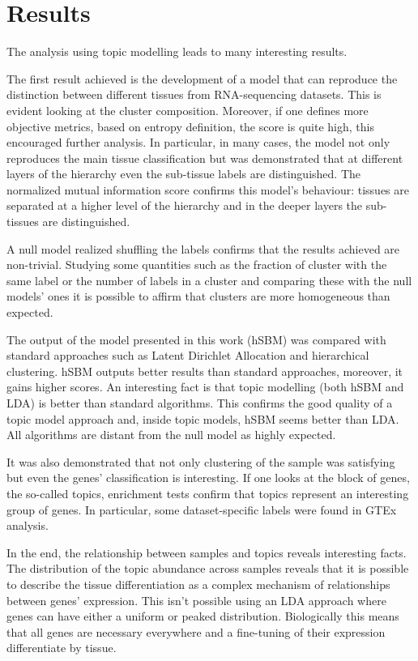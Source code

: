\section{Results}\label{sec:topic/results}
The analysis using topic modelling leads to many interesting results.

The first result achieved is the development of a model that can reproduce the distinction between different tissues from RNA-sequencing datasets. This is evident looking at the cluster composition. Moreover, if one defines more objective metrics, based on entropy definition, the score is quite high, this encouraged further analysis. In particular, in many cases, the model not only reproduces the main tissue classification but was demonstrated that at different layers of the hierarchy even the sub-tissue labels are distinguished. The normalized mutual information score confirms this model's behaviour: tissues are separated at a higher level of the hierarchy and in the deeper layers the sub-tissues are distinguished.

A null model realized shuffling the labels confirms that the results achieved are non-trivial. Studying some quantities such as the fraction of cluster with the same label or the number of labels in a cluster and comparing these with the null models' ones it is possible to affirm that clusters are more homogeneous than expected.

The output of the model presented in this work (hSBM) was compared with standard approaches such as Latent Dirichlet Allocation and hierarchical clustering. hSBM outputs better results than standard approaches, moreover, it gains higher scores. An interesting fact is that topic modelling (both hSBM and LDA) is better than standard algorithms. This confirms the good quality of a topic model approach and, inside topic models, hSBM seems better than LDA. All algorithms are distant from the null model as highly expected.

It was also demonstrated that not only clustering of the sample was satisfying but even the genes' classification is interesting. If one looks at the block of genes, the so-called topics, enrichment tests confirm that topics represent an interesting group of genes. In particular, some dataset-specific labels were found in GTEx analysis.

In the end, the relationship between samples and topics reveals interesting facts. The distribution of the topic abundance across samples reveals that it is possible to describe the tissue differentiation as a complex mechanism of relationships between genes' expression. This isn't possible using an LDA approach where genes can have either a uniform or peaked distribution. Biologically this means that all genes are necessary everywhere and a fine-tuning of their expression differentiate by tissue.

